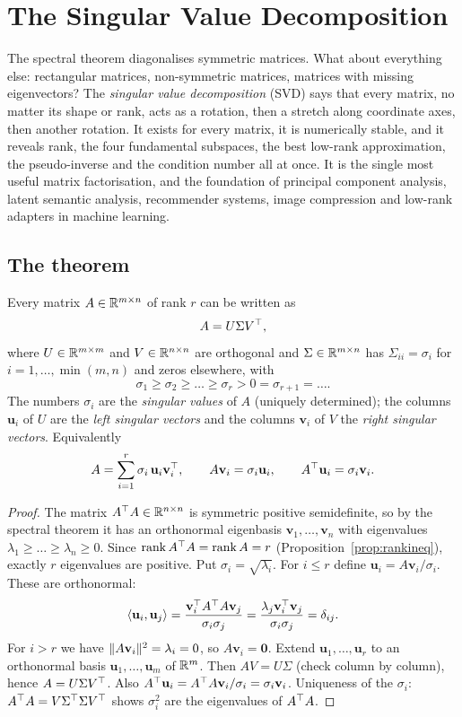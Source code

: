 \chapter{The Singular Value Decomposition}

The spectral theorem diagonalises symmetric matrices. What about everything else: rectangular matrices, non-symmetric matrices, matrices with missing eigenvectors? The \emph{singular value decomposition} (SVD) says that every matrix, no matter its shape or rank, acts as a rotation, then a stretch along coordinate axes, then another rotation. It exists for every matrix, it is numerically stable, and it reveals rank, the four fundamental subspaces, the best low-rank approximation, the pseudo-inverse and the condition number all at once. It is the single most useful matrix factorisation, and the foundation of principal component analysis, latent semantic analysis, recommender systems, image compression and low-rank adapters in machine learning.

\section{The theorem}

\begin{theorem}\label{thm:svd}
Every matrix $A\in\mathbb{R}^{m\times n}$ of rank $r$ can be written as
\[ A=U\Sigma V^{\top}, \]
where $U\in\mathbb{R}^{m\times m}$ and $V\in\mathbb{R}^{n\times n}$ are orthogonal and $\Sigma\in\mathbb{R}^{m\times n}$ has $\Sigma_{ii}=\sigma_i$ for $i=1,\dots,\min(m,n)$ and zeros elsewhere, with
\[ \sigma_1\ge\sigma_2\ge\dots\ge\sigma_r>0=\sigma_{r+1}=\dots. \]
The numbers $\sigma_i$ are the \emph{singular values} of $A$ (uniquely determined); the columns $\mathbf{u}_i$ of $U$ are the \emph{left singular vectors} and the columns $\mathbf{v}_i$ of $V$ the \emph{right singular vectors}. Equivalently
\[ A=\sum_{i=1}^r\sigma_i\,\mathbf{u}_i\mathbf{v}_i^{\top},\qquad A\mathbf{v}_i=\sigma_i\mathbf{u}_i,\qquad A^{\top}\mathbf{u}_i=\sigma_i\mathbf{v}_i. \]
\end{theorem}

\begin{proof}
The matrix $A^{\top} A\in\mathbb{R}^{n\times n}$ is symmetric positive semidefinite, so by the spectral theorem it has an orthonormal eigenbasis $\mathbf{v}_1,\dots,\mathbf{v}_n$ with eigenvalues $\lambda_1\ge\dots\ge\lambda_n\ge0$. Since $\operatorname{rank} A^{\top} A=\operatorname{rank} A=r$ (Proposition~\ref{prop:rankineq}), exactly $r$ eigenvalues are positive. Put $\sigma_i=\sqrt{\lambda_i}$. For $i\le r$ define $\mathbf{u}_i=A\mathbf{v}_i/\sigma_i$. These are orthonormal:
\[ \langle \mathbf{u}_i,\mathbf{u}_j\rangle=\frac{\mathbf{v}_i^{\top} A^{\top} A\mathbf{v}_j}{\sigma_i\sigma_j}=\frac{\lambda_j\mathbf{v}_i^{\top}\mathbf{v}_j}{\sigma_i\sigma_j}=\delta_{ij}. \]
For $i>r$ we have $\lVert A\mathbf{v}_i\rVert^2=\lambda_i=0$, so $A\mathbf{v}_i=\mathbf{0}$. Extend $\mathbf{u}_1,\dots,\mathbf{u}_r$ to an orthonormal basis $\mathbf{u}_1,\dots,\mathbf{u}_m$ of $\mathbb{R}^m$. Then $AV=U\Sigma$ (check column by column), hence $A=U\Sigma V^{\top}$. Also $A^{\top}\mathbf{u}_i=A^{\top} A\mathbf{v}_i/\sigma_i=\sigma_i\mathbf{v}_i$. Uniqueness of the $\sigma_i$: $A^{\top} A=V\Sigma^{\top}\Sigma V^{\top}$ shows $\sigma_i^2$ are the eigenvalues of $A^{\top} A$.
\end{proof}

